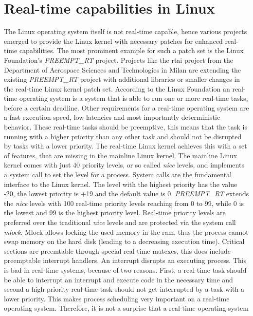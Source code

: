 \documentclass[titlepage]{report}
\begin{document}
\section{Real-time capabilities in Linux}
The Linux operating system itself is not real-time capable, hence various projects emerged to provide the Linux kernel with necessary patches for enhanced real-time capabilities. The most prominent example for such a patch set is
the Linux Foundation's \emph{PREEMPT\_RT} project. Projects like the \gls{rtai} project from the Department of Aerospace Sciences and Technologies in Milan are extending the existing \emph{PREEMPT\_RT} project with additional libraries or smaller
changes in the real-time Linux kernel patch set. According to the Linux Foundation an real-time operating system is a system that is able to run one or more real-time tasks, before a certain deadline\cite{RTLinux}.
Other requirements for a real-time operating system are a fast execution speed, low latencies and most importantly deterministic behavior.
These real-time tasks should be preemptive, this means that the task is running with a higher priority than any other task and should not be disrupted by tasks with a lower priority. The real-time Linux kernel achieves this with
a set of features, that are missing in the mainline Linux kernel. The mainline Linux kernel comes with just 40 priority levels, or so called \emph{nice} levels, and implements a system call to set the level for a process\cite{tanenbaum2009modern}.
System calls are the fundamental interface to the Linux kernel\cite{syscalls}.
The level with the highest priority has the value -20, the lowest priority is +19 and the default value is 0. \emph{PREEMPT\_RT} extends the \emph{nice} levels with 100 real-time priority levels reaching from 0 to 99, while 0 is the lowest
and 99 is the highest priority level. Real-time priority levels are preferred over the traditional \emph{nice} levels and are protected via the system call \emph{mlock}\cite{Assmann}. Mlock allows locking the used memory in the \gls{ram}, thus
the process cannot swap memory on the hard disk (leading to a decreasing execution time)\cite{Mlock}. Critical sections are preemtable through special real-time mutexes, this does include preemptable interrupt handlers.
An interrupt disrupts an executing process. This is bad in real-time systems, because of two reasons. First, a real-time task should be able to interrupt an interrupt and execute code in the necessary time and second
a high priority real-time task should not get interrupted by a task with a lower priority. This makes process scheduling very important on a real-time operating system. Therefore, it is not a surprise that a real-time operating system
\end{document}
